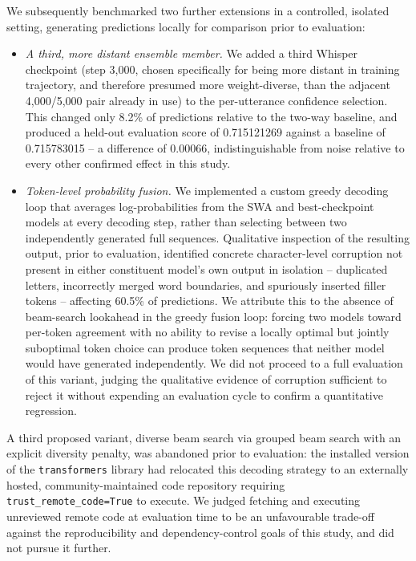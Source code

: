 \documentclass[11pt]{article}
\begin{document}
We subsequently benchmarked two further extensions in a controlled, isolated setting, generating predictions locally for comparison prior to evaluation:

\begin{itemize}
\item \textit{A third, more distant ensemble member.} We added a third Whisper checkpoint (step 3{,}000, chosen specifically for being more distant in training trajectory, and therefore presumed more weight-diverse, than the adjacent 4{,}000/5{,}000 pair already in use) to the per-utterance confidence selection. This changed only 8.2\% of predictions relative to the two-way baseline, and produced a held-out evaluation score of 0.715121269 against a baseline of 0.715783015 -- a difference of 0.00066, indistinguishable from noise relative to every other confirmed effect in this study.
\item \textit{Token-level probability fusion.} We implemented a custom greedy decoding loop that averages log-probabilities from the SWA and best-checkpoint models at every decoding step, rather than selecting between two independently generated full sequences. Qualitative inspection of the resulting output, prior to evaluation, identified concrete character-level corruption not present in either constituent model's own output in isolation -- duplicated letters, incorrectly merged word boundaries, and spuriously inserted filler tokens -- affecting 60.5\% of predictions. We attribute this to the absence of beam-search lookahead in the greedy fusion loop: forcing two models toward per-token agreement with no ability to revise a locally optimal but jointly suboptimal token choice can produce token sequences that neither model would have generated independently. We did not proceed to a full evaluation of this variant, judging the qualitative evidence of corruption sufficient to reject it without expending an evaluation cycle to confirm a quantitative regression.
\end{itemize}

A third proposed variant, diverse beam search via grouped beam search with an explicit diversity penalty, was abandoned prior to evaluation: the installed version of the \texttt{transformers} library had relocated this decoding strategy to an externally hosted, community-maintained code repository requiring \texttt{trust\_remote\_code=True} to execute. We judged fetching and executing unreviewed remote code at evaluation time to be an unfavourable trade-off against the reproducibility and dependency-control goals of this study, and did not pursue it further.
\end{document}
